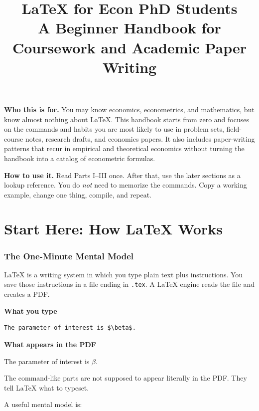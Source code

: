 \documentclass[11pt]{article}
\title{\textbf{LaTeX for Econ PhD Students}\\[0.35em]
\large A Beginner Handbook for Coursework and Academic Paper Writing}
\author{}
\date{}
\newcommand{\code}[1]{\texttt{#1}}
\theoremstyle{definition}
\newcommand{\sourcehead}{\par\smallskip\textbf{What you type}\par}
\newcommand{\resulthead}{\par\smallskip\textbf{What appears in the PDF}\par\smallskip}
\begin{document}
\maketitle

\begin{center}
\begin{minipage}{0.91\textwidth}
\small
\textbf{Who this is for.} You may know economics, econometrics, and mathematics, but know almost nothing about LaTeX. This handbook starts from zero and focuses on the commands and habits you are most likely to use in problem sets, field-course notes, research drafts, and economics papers. It also includes paper-writing patterns that recur in empirical and theoretical economics without turning the handbook into a catalog of econometric formulas.

\textbf{How to use it.} Read Parts I--III once. After that, use the later sections as a lookup reference. You do \emph{not} need to memorize the commands. Copy a working example, change one thing, compile, and repeat.
\end{minipage}
\end{center}

\tableofcontents
\clearpage

\part{Start Here: How LaTeX Works}

\section{The One-Minute Mental Model}

LaTeX is a writing system in which you type plain text plus instructions. You save those instructions in a file ending in \code{.tex}. A LaTeX engine reads the file and creates a PDF.

\sourcehead
\begin{lstlisting}
The parameter of interest is $\beta$.
\end{lstlisting}

\resulthead
The parameter of interest is $\beta$.

The command-like parts are not supposed to appear literally in the PDF. They tell LaTeX what to typeset.

A useful mental model is:
\end{document}

